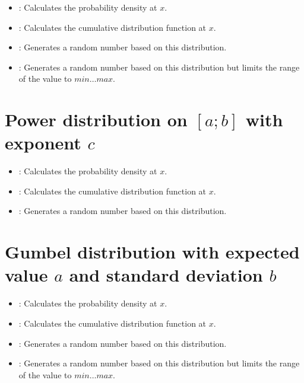 \begin{itemize}

\item
{}:
Calculates the probability density at $x$.

\item
{}:
Calculates the cumulative distribution function at $x$.

\item
{}:
Generates a random number based on this distribution.

\item
{}:
Generates a random number based on this distribution but limits the range of the value to $min\ldots max$.

\end{itemize}



\section{Power distribution on \texorpdfstring{$[a;b]$}{[a;b]} with exponent \texorpdfstring{$c$}{c}}

\begin{itemize}

\item
{}:
Calculates the probability density at $x$.

\item
{}:
Calculates the cumulative distribution function at $x$.

\item
{}:
Generates a random number based on this distribution.

\end{itemize}



\section{Gumbel distribution with expected value \texorpdfstring{$a$}{a} and standard deviation \texorpdfstring{$b$}{b}}

\begin{itemize}

\item
{}:
Calculates the probability density at $x$.

\item
{}:
Calculates the cumulative distribution function at $x$.

\item
{}:
Generates a random number based on this distribution.

\item
{}:
Generates a random number based on this distribution but limits the range of the value to $min\ldots max$.

\end{itemize}



